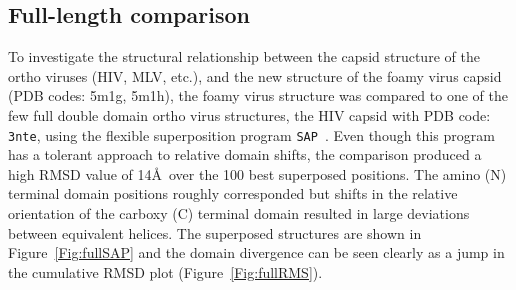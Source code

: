 \documentclass[preprint,12pt]{elsarticle}
\newcommand{\SAP}{{\tt SAP}}
\newcommand{\Fig}[1]{Figure~\ref{Fig:#1}}
\begin{document}
\subsection{Full-length comparison}

To investigate the structural relationship between the capsid structure of the ortho viruses (HIV, MLV, etc.),
and the new structure of the foamy virus capsid \cite{BallNJet16} (PDB codes: 5m1g, 5m1h), the foamy virus structure was
compared to one of the few full double domain ortho virus structures, the HIV capsid with PDB code: {\tt 3nte},
using the flexible superposition program \SAP\ \cite{TaylorWR99a}.   Even though this program has a tolerant approach
to relative domain shifts, the comparison produced a high RMSD value of 14\AA\ over the 100 best superposed
positions.   The amino (N) terminal domain positions roughly corresponded but shifts in the relative
orientation of the carboxy (C) terminal domain resulted in large deviations between equivalent helices.
The superposed structures are shown in \Fig{fullSAP} and the domain divergence can be seen clearly as a
jump in the cumulative RMSD plot (\Fig{fullRMS}).
\end{document}
